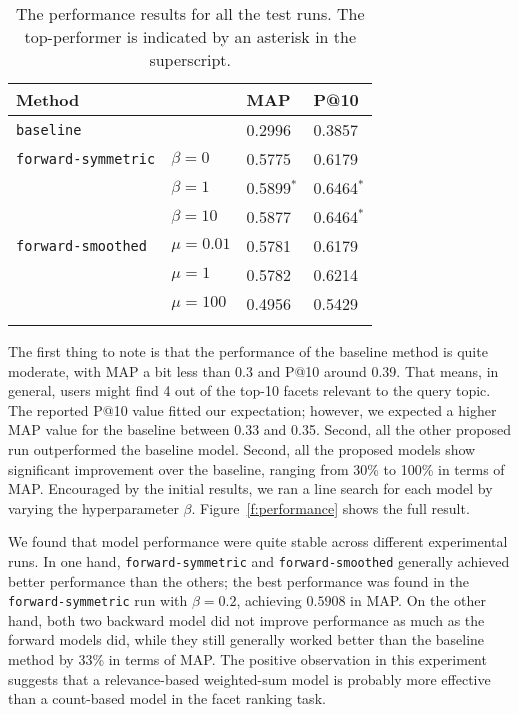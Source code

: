 \begin{table}[ht!]
  \centering
  \begin{tabular}{llll}
    Method & & MAP & P@10 \\
    \hline
    {\tt baseline} & & 0.2996 & 0.3857 \\
    {\tt forward-symmetric} & $\beta = 0$ & 0.5775 & 0.6179\\
    & $\beta = 1$ & 0.5899$^*$ & 0.6464$^*$ \\
    & $\beta = 10$ & 0.5877 & 0.6464$^*$ \\
    {\tt forward-smoothed} & $\mu = 0.01$ & 0.5781 & 0.6179 \\
    & $\mu = 1$ & 0.5782 & 0.6214 \\
    & $\mu = 100$ & 0.4956 & 0.5429 \\
    \\
  \end{tabular}
  \caption{The performance results for all the test runs.  The top-performer is indicated by an asterisk in the superscript.}
  \label{t:performance}
\end{table}

The first thing to note is that the performance of the baseline method is quite
moderate, with MAP a bit less than 0.3 and P@10 around 0.39.  That means, in
general, users might find 4 out of the top-10 facets relevant to the query
topic.  The reported P@10 value fitted our expectation; however, we expected a
higher MAP value for the baseline between 0.33 and 0.35.  Second, all the other
proposed run outperformed the baseline model.  Second, all the proposed models
show significant improvement over the baseline, ranging from 30\% to 100\% in
terms of MAP.  Encouraged by the initial results, we ran a line search for each
model by varying the hyperparameter $\beta$.  Figure~\ref{f:performance} shows
the full result.  

We found that model performance were quite stable across different experimental
runs.  In one hand, {\tt forward-symmetric} and {\tt forward-smoothed}
generally achieved better performance than the others; the best performance was
found in the {\tt forward-symmetric} run with $\beta = 0.2$, achieving $0.5908$
in MAP.  On the other hand, both two backward model did not improve performance
as much as the forward models did, while they still generally worked better
than the baseline method by 33\% in terms of MAP.  The positive observation in
this experiment suggests that a relevance-based weighted-sum model is probably
more effective than a count-based model in the facet ranking task.  

